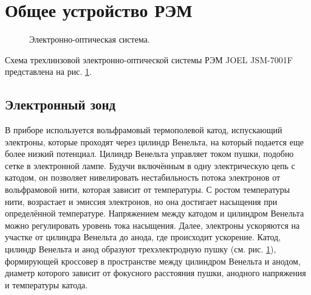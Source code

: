 \documentclass[a4paper,12pt]{article}	%
\begin{document}
    
\section{Общее устройство РЭМ}

    \begin{figure}[!h]
    	\caption{Электронно-оптическая система.}
    	\label{ЭО сис}
    \end{figure}
    
\noindent Схема трехлинзовой электронно-оптической системы РЭМ JOEL JSM-7001F представлена на рис. \ref{ЭО сис}.

    \subsection{Электронный зонд}

\noindent В приборе используется вольфрамовый термополевой катод, испускающий электроны, которые проходят через цилиндр Венельта, на который подается еще более низкий потенциал. Цилиндр Венельта управляет током пушки, подобно сетке в электронной лампе. Будучи включённым в одну электрическую цепь с катодом, он позволяет нивелировать нестабильность потока электронов от вольфрамовой нити, которая зависит от температуры. С ростом температуры нити, возрастает и эмиссия электронов, но она достигает насыщения при определённой температуре. Напряжением между катодом и цилиндром Венельта можно регулировать уровень тока насыщения. Далее, электроны ускоряются на участке от цилиндра Венельта до анода, где происходит ускорение. Катод, цилиндр Венельта и анод образуют трехэлектродную пушку (см. рис. \ref{ЭО сис}), формирующей кроссовер в пространстве между цилиндром Венельта и анодом, диаметр которого зависит от фокусного расстояния пушки, анодного напряжения и температуры катода.
\end{document}
